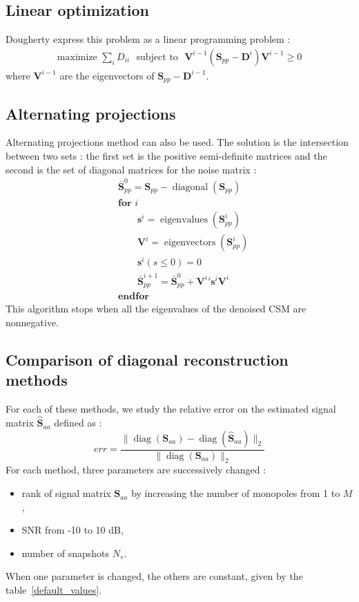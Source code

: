 \documentclass[fontsize=12pt,DIV13,paper=a4,abstract=true,titlepage=false]{scrartcl}
\newcommand{\bo}[1]{ \mathbf{#1} }
\begin{document}
\subsection{Linear optimization}
Dougherty express this problem as a linear programming problem :
\begin{equation}
	\begin{aligned}
        		\text{maximize~} \sum_i D_{ii} \text{~~subject to~~}  \bo{V}^{i-1} \left( \bo{S}_{pp}-\bo{D}^i \right) \bo{V}^{i-1} \geq 0 
	\end{aligned}
\end{equation}
where $\bo{V}^{i-1}$ are the eigenvectors of $\bo{S}_{pp}-\bo{D}^{i-1} $.
 
 \subsection{Alternating projections}
Alternating projections method can also be used. The solution is the intersection between two sets : the first set is the positive semi-definite matrices and the second is the set of diagonal matrices for the noise matrix : 
\begin{equation}
	\begin{aligned}
		    &\bar{\bo{S}}_{pp}^0 = \bo{S}_{pp}-\operatorname{diagonal}(\bo{S}_{pp})\\
		    &\textbf{for~} i\\
		    & \qquad  \bo{s}^i = \operatorname{eigenvalues}(\bo{S}_{pp}^i)\\
		    & \qquad \bo{V}^i = \operatorname{eigenvectors}(\bo{S}_{pp}^i)\\
		   & \qquad \bo{s}^i(s \leq 0) = 0\\
		   & \qquad \bar{\bo{S}}_{pp}^{i+1} = \bar{\bo{S}}_{pp}^0 + \bo{V}^{i}{'}\bo{s}^i\bo{V}^i \\
		   &\textbf{endfor}
	\end{aligned}
\end{equation}
This algorithm stops when all the eigenvalues of the denoised CSM are nonnegative.

\subsection{Comparison of diagonal reconstruction methods}
For each of these methods, we study the relative error on the estimated signal matrix $\hat{\bo{S}}_{aa}$ defined as : 
\begin{equation}
    err = \frac{\| \operatorname{diag}(\bo{S}_{aa} ) - \operatorname{diag}(\hat{\bo{S}}_{aa})\|_2}{\|\operatorname{diag}(\bo{S}_{aa} ) \|_2}
\end{equation}
For each method, three parameters are successively changed : 
\begin{itemize}
    \item rank of signal matrix $\bo{S}_{aa}$ by increasing the number of monopoles from 1 to $M$,
    \item SNR from -10 to 10 dB,
    \item number of snapshots $N_s$.
\end{itemize}
When one parameter is changed, the others are constant, given by the table~\ref{default_values}.\\
\end{document}
